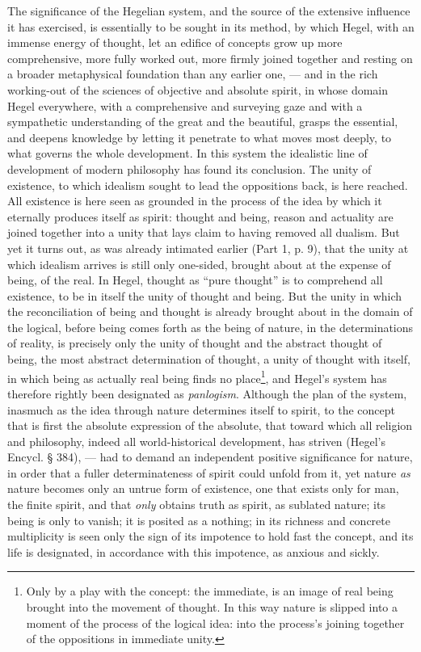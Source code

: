 The significance of the Hegelian system, and the source of the
extensive influence it has exercised, is essentially to be sought in
its method, by which Hegel, with an immense energy of thought, let an
edifice of concepts grow up more comprehensive, more fully worked out,
more firmly joined together and resting on a broader metaphysical
foundation than any earlier one, --- and in the rich working-out of
the sciences of objective and absolute spirit, in whose domain Hegel
everywhere, with a comprehensive and surveying gaze and with a
sympathetic understanding of the great and the beautiful, grasps the
essential, and deepens knowledge by letting it penetrate to what moves
most deeply, to what governs the whole development. In this system the
idealistic line of development of modern philosophy has found its
conclusion. The unity of existence, to which idealism sought to lead
the oppositions back, is here reached. All existence is here seen as
grounded in the process of the idea by which it eternally produces
itself as spirit: thought and being, reason and actuality are joined
together into a unity that lays claim to having removed all dualism.
But yet it turns out, as was already intimated earlier (Part 1, p. 9),
that the unity at which idealism arrives is still only one-sided,
brought about at the expense of being, of the real. In Hegel, thought
as ``pure thought'' is to comprehend all existence, to be in itself the
unity of thought and being. But the unity in which the reconciliation
of being and thought is already \setcounter{footnote}{0}brought
about in the domain of the logical, before being comes forth as the
being of nature, in the determinations of reality, is precisely only
the unity of thought and the abstract thought of being, the most
abstract determination of thought, a unity of thought with itself, in
which being as actually real being finds no place\footnote{Only by a
play with the concept: the immediate, is an image of real being brought
into the movement of thought. In this way nature is slipped into a
moment of the process of the logical idea: into the process's joining
together of the oppositions in immediate unity.}, and Hegel's system
has therefore rightly been designated as \emph{panlogism}. Although the
plan of the system, inasmuch as the idea through nature determines
itself to spirit, to the concept that is first the absolute expression
of the absolute, that toward which all religion and philosophy, indeed
all world-historical development, has striven (Hegel's Encycl. § 384),
--- had to demand an independent positive significance for nature, in
order that a fuller determinateness of spirit could unfold from it, yet
nature \emph{as} nature becomes only an untrue form of existence, one
that exists only for man, the finite spirit, and that \emph{only}
obtains truth as spirit, as sublated nature; its being is only to
vanish; it is posited as a nothing; in its richness and concrete
multiplicity is seen only the sign of its impotence to hold fast the
concept, and its life is designated, in accordance with this impotence,
as anxious and sickly.

